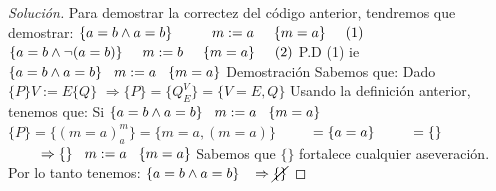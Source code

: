 \begin{proof}[Solución]
Para demostrar la correctez del código anterior, tendremos que demostrar:
\newline
$\{a=b \wedge a=b \} \hspace*{1cm}  m:=a \hspace*{.5cm} \{m=a \} \hspace*{.5cm} (1)$   
\newline
$\{a=b \wedge \neg (a=b) \} \hspace*{.5cm}  m:=b \hspace*{.5cm} \{m=a \} \hspace*{.5cm} (2)$   
\vspace*{0.5cm}
\newline
P.D (1) ie $ \{a=b \wedge a=b \} \hspace*{0.3cm}  m:=a \hspace*{.3cm} \{m=a \}$   
\vspace*{0.5cm}
\newline
Demostración
\vspace*{0.3cm}
\newline
Sabemos que:
\newline
Dado $\{P\} V:=E \{Q\}$
\newline
$\Rightarrow  \{P\} = \{Q_{E}^{V} \} = \{V=E, Q \} $
\vspace*{0.3cm}
\newline
Usando la definición anterior, tenemos que:
Si $ \{a=b \wedge a=b \} \hspace*{0.3cm}  m:=a \hspace*{.3cm} \{m=a \}$  
\newline
$ \{ P \} = \{ (m=a)_{a}^{m}   \} = \{m=a,(m=a)\} $
\newline
$ \hspace*{0.8cm} =\{ a=a \}$
\newline
$ \hspace*{0.8cm} = \{ \} $
\newline
$ \hspace*{0.8cm} \Rightarrow  \{ \} \hspace*{0.3cm} m:=a \hspace*{0.3cm} \{ m=a \} $
\newline
Sabemos que $ \{ \} $ fortalece cualquier aseveración.
\vspace*{0.3cm}
\newline
Por lo tanto tenemos:
\newline
$ \{a=b \wedge a=b \} \hspace*{0.3cm} \Rightarrow  \cancel{\{ \}}$

\end{proof}
